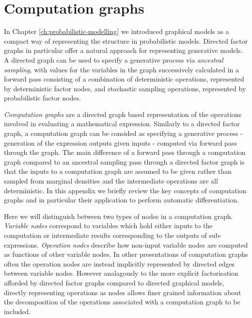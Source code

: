 \chapter{Computation graphs}\label{ch:computation-graphs}

In Chapter \ref{ch:probabilistic-modelling} we introduced graphical models as a compact way of representing the structure in probabilistic models. Directed factor graphs in particular offer a natural approach for representing generative models. A directed graph can be used to specify a generative process via \emph{ancestral sampling}, with values for the variables in the graph successively calculated in a forward pass consisting of a combination of deterministic operations, represented by deterministic factor nodes, and stochastic sampling operations, represented by probabilistic factor nodes. %

\emph{Computation graphs} \citep{bauer1974computational} are a directed graph based representation of the operations involved in evaluating a mathematical expression. Similarly to a directed factor graph, a computation graph can be consided as specifying a generative process - generation of the expression outputs  given inputs - computed via forward pass through the graph. The main difference of a forward pass through a computation graph compared to an ancestral sampling pass through a directed factor graph is that the inputs to a computation graph are assumed to be given rather than sampled from marginal densities and the intermediate operations are all deterministic. In this appendix we briefly review the key concepts of computation graphs and in particular their application to perform automatic differentiation. 

Here we will distinguish between two types of nodes in a computation graph. \emph{Variable nodes} correspond to variables which hold either inputs to the computation or intermediate results corresponding to the outputs of sub-expressions. \emph{Operation nodes} describe how non-input variable nodes are computed as functions of other variable nodes. In other presentations of computation graphs often the operation nodes are instead implicitly represented by directed edges between variable nodes. However analagously to the more explicit factorisation afforded by directed factor graphs compared to directed graphical models, directly representing operations as nodes allows finer grained information about the decomposition of the operations associated with a computation graph to be included.

